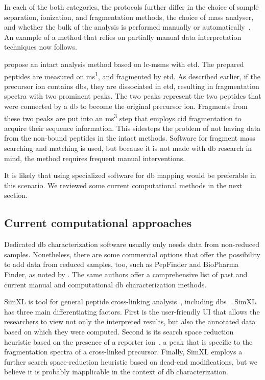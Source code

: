In each of the both categories, the protocols further differ in the choice of sample separation, ionization, and fragmentation methods, the choice of mass analyser, and whether the bulk of the analysis is performed manually or automatically~\cite{lakbub2018recent}. An example of a method that relies on partially manual data interpretation techniques now follows.

\citet{wu2009mass} propose an intact analysis method based on \gls*{lc}-\gls*{msms} with \gls*{etd}\@. The prepared peptides are measured on \gls*{ms}\textsuperscript{1}, and fragmented by \gls*{etd}\@. As described earlier, if the precursor ion contains \glspl*{db}, they are dissociated in \gls*{etd}, resulting in fragmentation spectra with two prominent peaks. The two peaks represent the two peptides that were connected by a \gls*{db} to become the original precursor ion. Fragments from these two peaks are put into an \gls*{ms}\textsuperscript{3} step that employs \gls*{cid} fragmentation to acquire their sequence information. This sidesteps the problem of not having data from the non-bound peptides in the intact methods. Software for fragment mass searching and matching is used, but because it is not made with \gls*{db} research in mind, the method requires frequent manual interventions.

It is likely that using specialized software for \gls*{db} mapping would be preferable in this scenario. We reviewed some current computational methods in the next section.

\subsection{Current computational approaches}

Dedicated \gls*{db} characterization software usually only needs data from non-reduced samples. Nonetheless, there are some commercial options that offer the possibility to add data from reduced samples, too, such as PepFinder and BioPharma Finder, as noted by \citet{lakbub2018recent}. The same authors offer a comprehensive list of past and current manual and computational \gls*{db} characterization methods.

SimXL is tool for general peptide cross-linking analysis~\cite{lima2015sim}, including \glspl*{db}~\cite{cui2019comprehensive}. SimXL has three main differentiating factors. First is the user-friendly UI that allows the researchers to view not only the interpreted results, but also the annotated data based on which they were computed. Second is its search space reduction heuristic based on the presence of a reporter ion~\cite{iglesias2010identification}, a peak that is specific to the fragmentation spectra of a cross-linked precursor. Finally, SimXL employs a further search space-reduction heuristic based on dead-end modifications, but we believe it is probably inapplicable in the context of \gls*{db} characterization.


